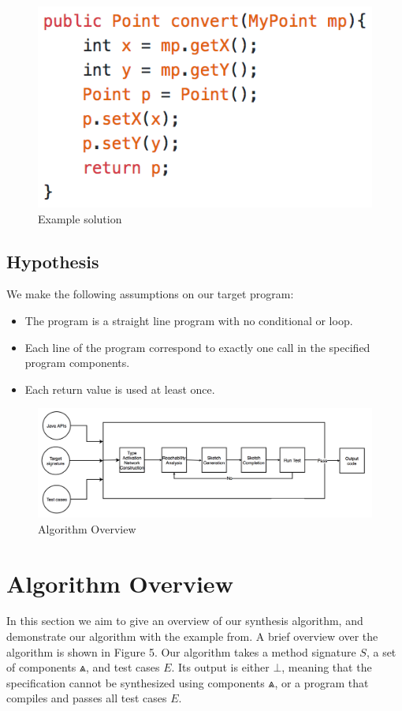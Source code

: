\documentclass[twocolumn]{article}
\begin{document}
\begin{figure}[h]
\centering
\includegraphics[scale = 0.65]{sample_solution.png}
\caption{Example solution}
\end{figure}
\subsection{Hypothesis}
We make the following assumptions on our target program:
\begin{itemize}
    \item The program is a straight line program with no conditional or loop.
    \item Each line of the program correspond to exactly one call in the specified program components.
    \item Each return value is used at least once.
\end{itemize}
\begin{figure}
\centering
\includegraphics[width=\textwidth]{overviewhor.png}
\caption{Algorithm Overview}
\end{figure}
\section{Algorithm Overview}
In this section we aim to give an overview of our synthesis algorithm, and demonstrate our algorithm with the example from. A brief overview over the algorithm is shown in Figure 5. Our algorithm takes a method signature $S$, a set of components $\Wedge$, and test cases $E$. Its output is either $\bot$, meaning that the specification cannot be synthesized using components $\Wedge$, or a program that compiles and passes all test cases $E$.\\
\end{document}
